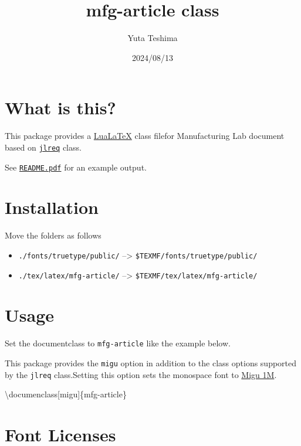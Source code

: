 \documentclass[
  pandoc]{mfg-article}
\title{mfg-article class}
\author{Yuta Teshima}
\date{2024/08/13}
\newenvironment{Shaded}{}{}
\newcommand{\FunctionTok}[1]{\textcolor[rgb]{0.02,0.16,0.49}{#1}}
\newcommand{\NormalTok}[1]{#1}
\providecommand{\tightlist}{%
  \setlength{\itemsep}{0pt}\setlength{\parskip}{0pt}}
\begin{document}
\maketitle

\hypertarget{what-is-this}{%
\section{What is this?}\label{what-is-this}}

This package provides a \href{https://www.luatex.org/}{LuaLaTeX} class
filefor Manufacturing Lab document based on
\href{https://github.com/abenori/jlreq}{\texttt{jlreq}} class.

See \href{./README.pdf}{\texttt{README.pdf}} for an example output.

\hypertarget{installation}{%
\section{Installation}\label{installation}}

Move the folders as follows

\begin{itemize}
\tightlist
\item
  \texttt{./fonts/truetype/public/} --\textgreater{}
  \texttt{\$TEXMF/fonts/truetype/public/}
\item
  \texttt{./tex/latex/mfg-article/} --\textgreater{}
  \texttt{\$TEXMF/tex/latex/mfg-article/}
\end{itemize}

\hypertarget{usage}{%
\section{Usage}\label{usage}}

Set the documentclass to \texttt{mfg-article} like the example below.

This package provides the \texttt{migu} option in addition to the class
options supported by the \texttt{jlreq} class.Setting this option sets
the monospace font to \href{https://mix-mplus-ipa.osdn.jp/migu/}{Migu
1M}.

\begin{Shaded}
\begin{Highlighting}[]
\FunctionTok{\textbackslash{}documenclass}\NormalTok{[migu]\{mfg{-}article\}}
\end{Highlighting}
\end{Shaded}

\hypertarget{font-licenses}{%
\section{Font Licenses}\label{font-licenses}}
\end{document}
